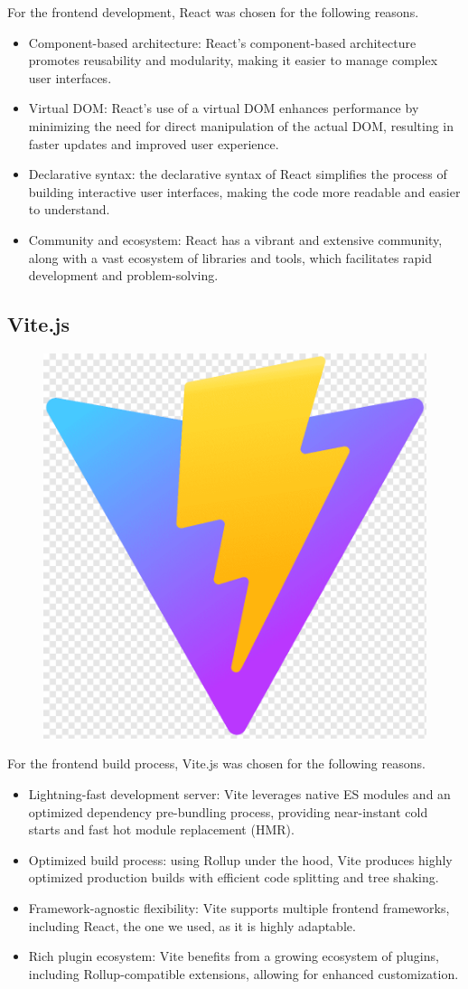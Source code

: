 For the frontend development, React was chosen for the following reasons.

\begin{itemize}

    \item Component-based architecture: React’s component-based architecture promotes reusability and modularity, making it easier to manage complex user interfaces.
    \item Virtual DOM: React’s use of a virtual DOM enhances performance by minimizing the need for direct manipulation of the actual DOM, resulting in faster updates and improved user experience.
    \item Declarative syntax: the declarative syntax of React simplifies the process of building interactive user interfaces, making the code more readable and easier to understand.
    \item Community and ecosystem: React has a vibrant and extensive community, along with a vast ecosystem of libraries and tools, which facilitates rapid development and problem-solving.

\end{itemize}

\subsection{Vite.js}

\begin{figure}[H]
\hfill
\includegraphics[width=0.1\linewidth]{../assets/tools-logos/vite.png}
\hspace{1cm}
\end{figure}

For the frontend build process, Vite.js was chosen for the following reasons.

\begin{itemize}

    \item Lightning-fast development server: Vite leverages native ES modules and an optimized dependency pre-bundling process, providing near-instant cold starts and fast hot module replacement (HMR).  
    \item Optimized build process: using Rollup under the hood, Vite produces highly optimized production builds with efficient code splitting and tree shaking.  
    \item Framework-agnostic flexibility: Vite supports multiple frontend frameworks, including React, the one we used, as it is highly adaptable.  
    \item Rich plugin ecosystem: Vite benefits from a growing ecosystem of plugins, including Rollup-compatible extensions, allowing for enhanced customization. 

\end{itemize}

